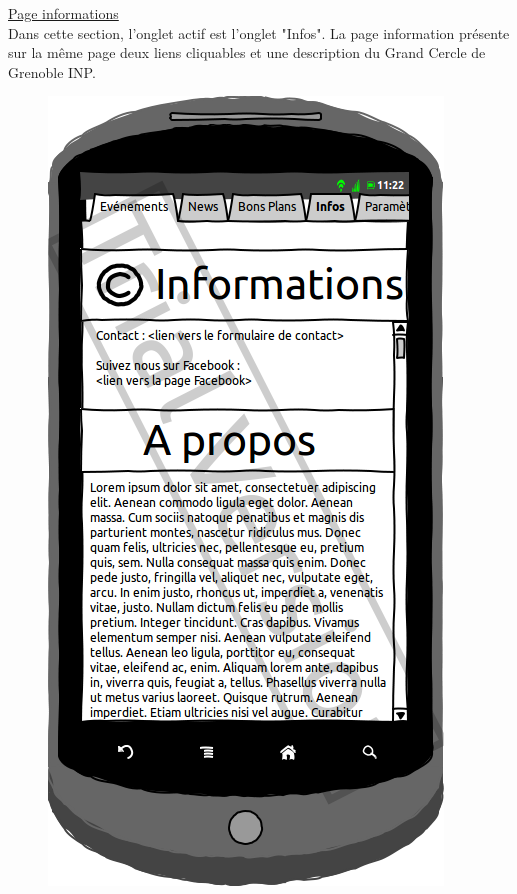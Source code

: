 \documentclass[a4paper, 11px]{article}
\begin{document}
\underline{Page informations}\\
Dans cette section, l'onglet actif est l'onglet "Infos".
La page information présente sur la même page deux liens cliquables et une description du Grand Cercle de Grenoble INP.
\vfill
\begin{figure}[htbp]
	\begin{minipage}[c]{.50\linewidth}
		\begin{center}
			\includegraphics[scale=0.3]{../../Sketch/Android/Infos.png}
		\end{center}
	\end{minipage}
\end{figure}
\end{document}
